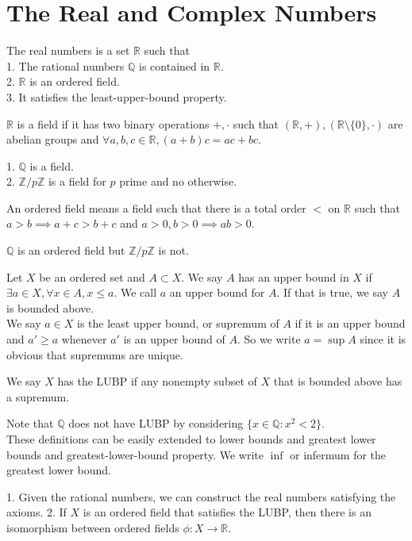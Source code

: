 \section{The Real and Complex Numbers}
\begin{definition}
    The real numbers is a set $\mathbb R$ such that\\
    1. The rational numbers $\mathbb Q$ is contained in $\mathbb R$.\\
    2. $\mathbb R$ is an ordered field.\\
    3. It satisfies the least-upper-bound property.
\end{definition}
$\mathbb R$ is a field if it has two binary operations $+,\cdot$ such that $(\mathbb R,+),(\mathbb R\setminus\{0\},\cdot)$ are abelian groups and $\forall a,b,c\in\mathbb R,(a+b)c=ac+bc$.
\begin{example}
    1. $\mathbb Q$ is a field.\\
    2. $\mathbb Z/p\mathbb Z$ is a field for $p$ prime and no otherwise.
\end{example}
An ordered field means a field such that there is a total order $<$ on $\mathbb R$ such that $a>b\implies a+c>b+c$ and $a>0,b>0\implies ab>0$.
\begin{example}
    $\mathbb Q$ is an ordered field but $\mathbb Z/p\mathbb Z$ is not.
\end{example}
\begin{definition}
    Let $X$ be an ordered set and $A\subset X$.
    We say $A$ has an upper bound in $X$ if $\exists a\in X,\forall x\in A,x\le a$.
    We call $a$ an upper bound for $A$.
    If that is true, we say $A$ is bounded above.\\
    We say $a\in X$ is the least upper bound, or supremum of $A$ if it is an upper bound and $a'\ge a$ whenever $a'$ is an upper bound of $A$.
    So we write $a=\sup A$ since it is obvious that supremums are unique.
\end{definition}
\begin{definition}
    We say $X$ has the LUBP if any nonempty subset of $X$ that is bounded above has a supremum.
\end{definition}
Note that $\mathbb Q$ does not have LUBP by considering $\{x\in\mathbb Q:x^2<2\}$.\\
These definitions can be easily extended to lower bounds and greatest lower bounds and greatest-lower-bound property.
We write $\inf$ or infermum for the greatest lower bound.
\begin{proposition}
    1. Given the rational numbers, we can construct the real numbers satisfying the axioms.
    2. If $X$ is an ordered field that satisfies the LUBP, then there is an isomorphism between ordered fields $\phi:X\to\mathbb R$.
\end{proposition}
